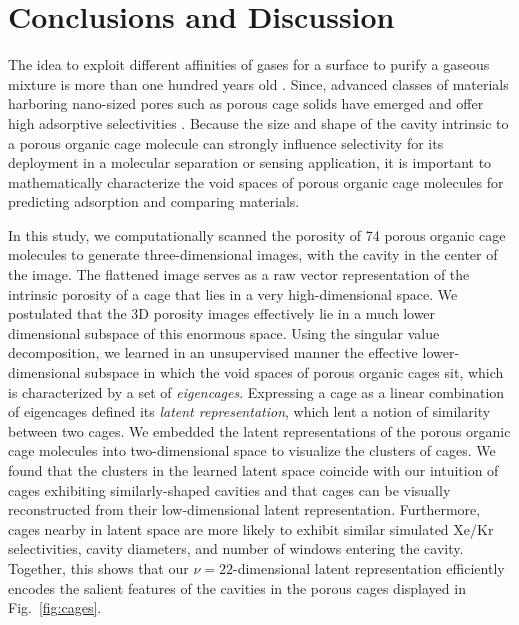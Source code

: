 \documentclass[journal=jacsat,manuscript=article,layout=traditional]{achemso}
\begin{document}
\section{Conclusions and Discussion}
The idea to exploit different affinities of gases for a surface to purify a gaseous mixture is more than one hundred years old \cite{boyle1908theabsorption}. Since, advanced classes of materials harboring nano-sized pores such as porous cage solids \cite{hasell2016porous,holst2010porous} have emerged and offer high adsorptive selectivities \cite{mastalerz2011salicylbisimine,tian2009amorphous,
hong2015porphyrin,chen2014separation,patil2016noria,sf6seps}.
Because the size and shape of the cavity intrinsic to a porous organic cage molecule can strongly influence selectivity for its deployment in a molecular separation or sensing application\cite{mitra2013molecular}, it is important to mathematically characterize the void spaces of porous organic cage molecules for predicting adsorption and comparing materials. 

In this study, we computationally scanned the {\color{red} porosity} of 74 porous organic cage molecules to generate three-dimensional images, {\color{red} with the cavity in the center of the image}. The flattened image serves as a raw vector representation of the intrinsic porosity of a cage that lies in a very high-dimensional space. We postulated that the 3D porosity images effectively lie in a much lower dimensional subspace of this enormous space. Using the singular value decomposition, we learned in an unsupervised manner the effective lower-dimensional subspace in which the void spaces of porous organic cages sit, which is characterized by a set of \emph{eigencages}. Expressing a cage as a linear combination of eigencages defined its \emph{latent representation}, which lent a notion of similarity between two cages. We embedded the latent representations of the porous organic cage molecules into two-dimensional space to visualize the clusters of cages. We found that the clusters in the learned latent space coincide with our intuition of cages exhibiting similarly-shaped cavities and that cages can be visually reconstructed from their low-dimensional latent representation. Furthermore, cages nearby in latent space are more likely to exhibit similar simulated Xe/Kr selectivities, cavity diameters, and number of windows entering the cavity. Together, this shows that our $\nu=22$-dimensional latent representation efficiently encodes the salient features of the cavities in the porous cages displayed in Fig.~\ref{fig:cages}.
\end{document}
